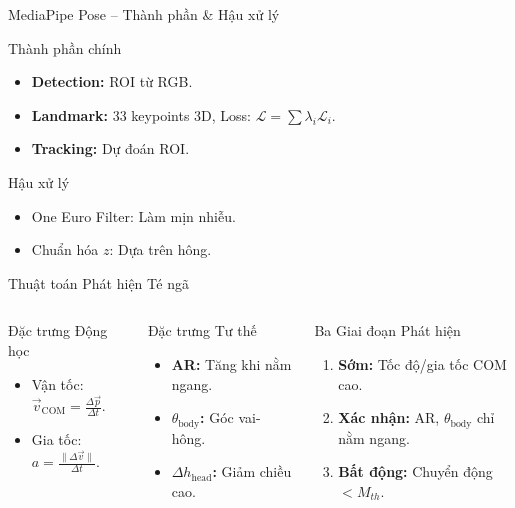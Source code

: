 \begin{frame}{MediaPipe Pose – Thành phần & Hậu xử lý}
    \begin{exampleblock}{Thành phần chính}
        \begin{itemize}
            \item \textbf{Detection:} ROI từ RGB.
            \item \textbf{Landmark:} 33 keypoints 3D, Loss: $\mathcal{L} = \sum \lambda_i \mathcal{L}_i$.
            \item \textbf{Tracking:} Dự đoán ROI.
        \end{itemize}
    \end{exampleblock}

    \begin{alertblock}{Hậu xử lý}
        \begin{itemize}
            \item One Euro Filter: Làm mịn nhiễu.
            \item Chuẩn hóa $z$: Dựa trên hông.
        \end{itemize}
    \end{alertblock}
\end{frame}

\begin{frame}{Thuật toán Phát hiện Té ngã}
    \begin{columns}[t]
        \begin{block}{Đặc trưng Động học}
            \begin{itemize}
                \item Vận tốc: $\vec{v}_{\text{COM}} = \frac{\Delta \vec{p}}{\Delta t}$.
                \item Gia tốc: $a = \frac{\|\Delta \vec{v}\|}{\Delta t}$.
            \end{itemize}
        \end{block}
        \begin{block}{Đặc trưng Tư thế}
            \begin{itemize}
                \item \textbf{AR:} Tăng khi nằm ngang.
                \item \textbf{$\theta_{\text{body}}$:} Góc vai-hông.
                \item \textbf{$\Delta h_{\text{head}}$:} Giảm chiều cao.
            \end{itemize}
        \end{block}
        \begin{alertblock}{Ba Giai đoạn Phát hiện}
            \begin{enumerate}
                \item \textbf{Sớm:} Tốc độ/gia tốc COM cao.
                \item \textbf{Xác nhận:} AR, $\theta_{\text{body}}$ chỉ nằm ngang.
                \item \textbf{Bất động:} Chuyển động $< M_{th}$.
            \end{enumerate}
        \end{alertblock}
    \end{columns}
\end{frame}
